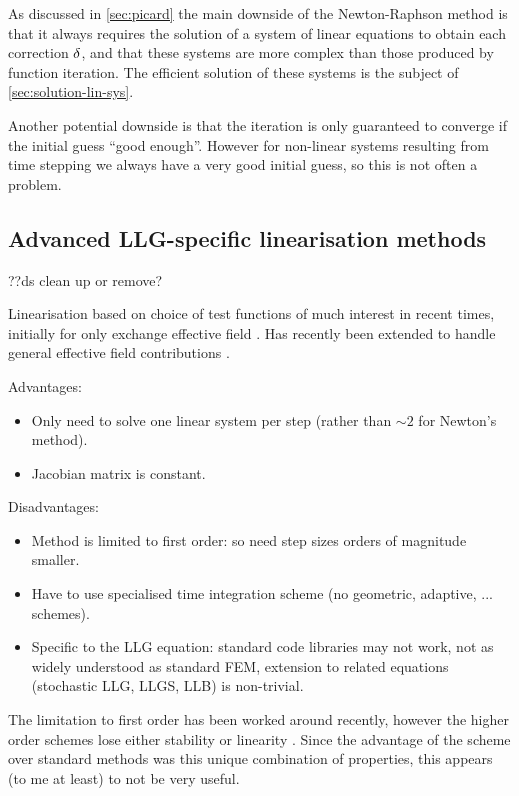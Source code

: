 
As discussed in \cref{sec:picard} the main downside of the Newton-Raphson method is that it always requires the solution of a system of linear equations to obtain each correction $\mathbf{\delta}$, and that these systems are more complex than those produced by function iteration.
The efficient solution of these systems is the subject of \cref{sec:solution-lin-sys}.

Another potential downside is that the iteration is only guaranteed to converge if the initial guess ``good enough''.
However for non-linear systems resulting from time stepping we always have a very good initial guess, so this is not often a problem.


\subsection{Advanced LLG-specific linearisation methods}
\label{sec:advanced-lin}

??ds clean up or remove?

Linearisation based on choice of test functions of much interest in recent times, initially for only exchange effective field \cite{Alouges2008}.
Has recently been extended to handle general effective field contributions \cite{Banas2012}.

Advantages:
\begin{itemize}
\item Only need to solve one linear system per step (rather than $\sim 2$ for Newton's method).
\item Jacobian matrix is constant.
\end{itemize}

Disadvantages:
\begin{itemize}
\item Method is limited to first order: so need step sizes orders of magnitude smaller.
\item Have to use specialised time integration scheme (no geometric, adaptive, ... schemes).
\item Specific to the LLG equation: standard code libraries may not work, not as widely understood as standard FEM, extension to related equations (stochastic LLG, LLGS, LLB) is non-trivial.
\end{itemize}

The limitation to first order has been worked around recently, however the higher order schemes lose either stability or linearity \cite{Kritsikis2014}.
Since the advantage of the scheme over standard methods was this unique combination of properties, this appears (to me at least) to not be very useful.

